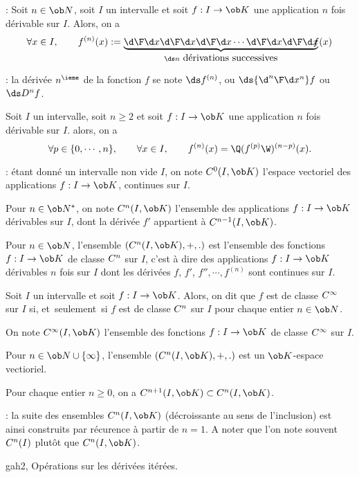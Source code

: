 \Remarque : Soit $n\in\ob N$, soit $I$ un intervalle et soit $f:I\to\ob K$ une application $n$ fois dérivable sur $I$. 
Alors, on a 
$$
\forall x\in I, \qquad f^{(n)}(x):=\underbrace{{\d\F \d x}{\d\F\d x}{\d\F \d x}\cdots{\d\F \d x}{\d\F \d x}}_{\ds n\mbox{ dérivations successives}}\!\!\!\!f(x)
$$

\Remarque : la dérivée $n^\ieme$ de la fonction $f$ se note $\ds f^{(n)}$, ou $\ds{\d^n\F\d x^n}f$ ou $\ds D^nf$. 
\bigskip

\Propriete []  Soit $I$ un intervalle, soit $n\ge2$ et soit $f:I\to\ob K$ une application $n$ fois dérivable sur $I$. alors, on a $$
\forall p\in\{0,\cdots, n\}, \qquad \forall x\in I, \qquad f^{(n)}(x)=\Q(f^{(p)}\W)^{(n-p)}(x).
$$

\Remarque : étant donné un intervalle non vide $I$, on note $\sc C^0(I,\ob K)$ l'espace vectoriel 
des applications $f:I\to\ob K$, continues sur $I$. 
\bigskip

\Definition []  Pour $n\in\ob N^*$, on note $\sc C^n(I,\ob K)$ l'ensemble des applications $f:I\to\ob K$ 
dérivables sur $I$, dont la dérivée $f'$ appartient à $\sc C^{n-1}(I,\ob K)$. 
\bigskip


\Propriete []  Pour $n\in\ob N$, l'ensemble $(\sc C^n(I,\ob K), +, .)$ est l'ensemble des fonctions $f:I\to\ob K$ de classe $\sc C^n$ sur $I$, c'est à dire des applications $f:I\to\ob K$ dérivables $n$ fois sur $I$ dont les dérivées $f$, $f'$, $f'', \cdots, f^{(n)}$ sont continues sur $I$. 
\bigskip

\Definition []  Soit $I$ un intervalle et soit $f:I\to\ob K$. Alors, on dit que $f$ est de classe $\sc C^\infty$ sur $I$ si, et~seulement~si $f$ est de classe $\sc C^n$ sur $I$ pour chaque entier $n\in\ob N$. 
\bigskip

\Definition []  
On note $\sc C^\infty(I,\ob K)$ l'ensemble des fonctions $f:I\to\ob K$ de classe $\sc C^\infty$ sur $I$. 
\bigskip

\Propriete []  Pour $n\in\ob N\cup\{\infty\}$, l'ensemble $(\sc C^n(I,\ob K), +, .)$ est un $\ob K$-espace vectioriel. 
\bigskip

\Propriete []  Pour chaque entier $n\ge0$, on a $\sc C^{n+1}(I,\ob K)\subset\sc C^n(I,\ob K)$. 
\bigskip

\Remarque : la suite des ensembles $\sc C^n(I,\ob K)$ (décroissante au sens de l'inclusion) est ainsi construits 
par récurence à partir de $n=1$. A noter que l'on note souvent $\sc C^n(I)$ plutôt que $\sc C^n(I,\ob K)$. 
\bigskip

\Subsection gah2, Opérations sur les dérivées itérées. 



